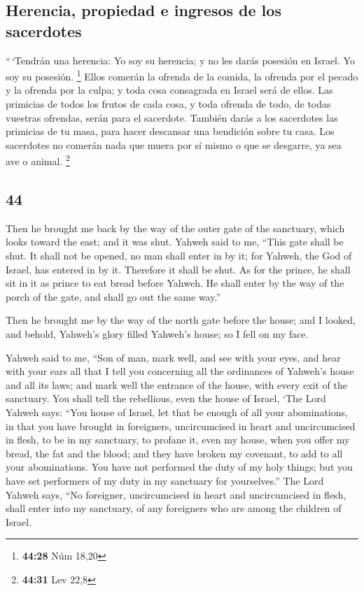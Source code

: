 \begin{paracol}{2}
\hypertarget{herencia-propiedad-e-ingresos-de-los-sacerdotes}{%
\subsection{Herencia, propiedad e ingresos de los
sacerdotes}\label{herencia-propiedad-e-ingresos-de-los-sacerdotes}}

 ``\,`Tendrán una herencia: Yo soy su herencia; y no les
darás posesión en Israel. Yo soy su posesión. \footnote{\textbf{44:28}
  Núm 18,20}  Ellos comerán la ofrenda de la comida, la
ofrenda por el pecado y la ofrenda por la culpa; y toda cosa consagrada
en Israel será de ellos.  Las primicias de todos los
frutos de cada cosa, y toda ofrenda de todo, de todas vuestras ofrendas,
serán para el sacerdote. También darás a los sacerdotes las primicias de
tu masa, para hacer descansar una bendición sobre tu casa.
 Los sacerdotes no comerán nada que muera por sí mismo o
que se desgarre, ya sea ave o animal. \footnote{\textbf{44:31} Lev 22,8}

\switchcolumn
\begin{otherlanguage}{english}

\hypertarget{section-87}{%
\section{44}\label{section-87}}

 Then he brought me back by the way of the outer gate of
the sanctuary, which looks toward the east; and it was shut.
 Yahweh said to me, ``This gate shall be shut. It shall
not be opened, no man shall enter in by it; for Yahweh, the God of
Israel, has entered in by it. Therefore it shall be shut. 
As for the prince, he shall sit in it as prince to eat bread before
Yahweh. He shall enter by the way of the porch of the gate, and shall go
out the same way.''

 Then he brought me by the way of the north gate before
the house; and I looked, and behold, Yahweh's glory filled Yahweh's
house; so I fell on my face.

 Yahweh said to me, ``Son of man, mark well, and see with
your eyes, and hear with your ears all that I tell you concerning all
the ordinances of Yahweh's house and all its laws; and mark well the
entrance of the house, with every exit of the sanctuary. 
You shall tell the rebellious, even the house of Israel, `The Lord
Yahweh says: ``You house of Israel, let that be enough of all your
abominations,  in that you have brought in foreigners,
uncircumcised in heart and uncircumcised in flesh, to be in my
sanctuary, to profane it, even my house, when you offer my bread, the
fat and the blood; and they have broken my covenant, to add to all your
abominations.  You have not performed the duty of my holy
things; but you have set performers of my duty in my sanctuary for
yourselves.''  The Lord Yahweh says, ``No foreigner,
uncircumcised in heart and uncircumcised in flesh, shall enter into my
sanctuary, of any foreigners who are among the children of Israel.


\end{otherlanguage}
\end{paracol}

